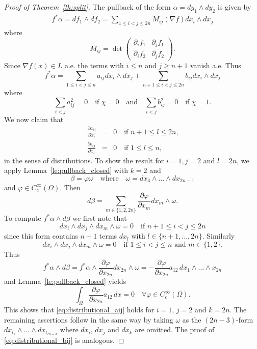 \documentclass[titlepage]{amsart}
\numberwithin{equation}{section}
\theoremstyle{plain}
\theoremstyle{definition}
\theoremstyle{remark}
\newcommand{\g}{\nabla }
\begin{document}
\begin{proof}[Proof of Theorem~\ref{th:split}]
The pullback of the form   $\alpha = dy_1 \wedge dy_2$   
   is given by
\begin{align*} f^*\alpha =  df_1 \wedge df_2 = \sum_{1 \le  i < j \le 2n}  M_{ij}(\g f) dx_i \wedge dx_j
\end{align*}
where 
$$ M_{ij} = \det \begin{pmatrix} \partial_i f_1 & \partial_j f_1 \\
\partial_i f_2 & \partial_j f_2
\end{pmatrix}.
$$
Since $\g f(x) \in L$ a.e. the terms with $i \le n$ and $j \ge n+1$ vanish a.e. Thus
\begin{equation}
f^*\alpha = \sum_{1 \le i < j \le n} a_{ij} dx_i \wedge dx_j + \sum_{n+1 \le i < j \le 2n} b_{ij} dx_i \wedge dx_j
\end{equation}
where 
\begin{equation}  \label{eq:chi_determines_a_b}  \sum_{i < j} a_{ij}^2 = 0 \quad \text{if $\chi = 0$} \quad \text{and} \quad  \sum_{i < j} b_{ij}^2 = 0
\quad \text{if $\chi = 1$}.
\end{equation}
We now claim that 
\begin{eqnarray}
\frac{\partial a_{ij}}{\partial x_l} &=& 0 \quad \text{if $n+1 \le l \le 2n$,}   \label{eq:distributional_aij}\\
\frac{\partial b_{ij}}{\partial x_l} &=& 0 \quad \text{if $1 \le l \le n$,} \label{eq:distributional_bij}
\end{eqnarray}
in the sense of distributions. 
To show the result for $i=1, j=2$ and $l = 2n$,  we apply Lemma~\ref{le:pullback_closed} with $k=2$ and
$$ \beta = \varphi \omega  \quad \text{where} \quad \omega = dx_3 \wedge \ldots \wedge dx_{2n-1}$$
and $\varphi \in C_c^\infty(\Omega)$. 
Then 
$$ d \beta =  \sum_{m \in \{1,2, 2n\}} \frac{\partial \varphi}{\partial x_m} dx_m \wedge \omega.$$
To compute $f^*\alpha \wedge d\beta$ we first note that 
$$ dx_i \wedge dx_j \wedge dx_m \wedge \omega = 0 \quad \text{if $n+1 \le i < j \le 2n$} $$
since this form contains $n+1$ terms $dx_l$ with $l \in \{n+1, \ldots, 2n\}$.
Similarly 
$$ dx_i \wedge dx_j \wedge dx_m \wedge \omega = 0 \quad \text{if $1 \le i < j \le n$ and $m \in \{1, 2\}$.} $$
Thus 
$$ f^*\alpha \wedge d\beta =  f^*\alpha \wedge \frac{\partial \varphi}{\partial x_{2n}} dx_{2n} \wedge \omega = 
- \frac{\partial \varphi}{\partial x_{2n}}    a_{12}  \,   dx_1 \wedge \ldots \wedge x_{2n}$$
and Lemma~\ref{le:pullback_closed} yields
$$ \int_\Omega \frac{\partial \varphi}{\partial x_{2n}} a_{12}  \, dx = 0 \quad \forall \varphi \in C_c^\infty(\Omega). $$
This shows that  \eqref{eq:distributional_aij} holds for $i=1$, $j=2$ and $k= 2n$.
The remaining assertions follow in the same way by taking $\omega$ as  the $(2n-3)$-form $dx_{l_1} \wedge \ldots \wedge dx_{l_{2n-3}}$
where $dx_i$, $dx_j$ and $dx_k$ are omitted. The proof of \eqref{eq:distributional_bij} is analogous. 



\end{proof}
\end{document}

